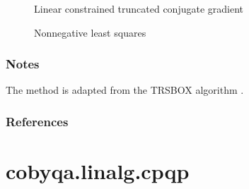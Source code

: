\documentclass[letterpaper,10pt,english]{sphinxmanual}
\begin{document}
\begin{fulllineitems}
\begin{description}
\item[{{\hyperref[\detokenize{refs/generated/cobyqa.linalg.lctcg:cobyqa.linalg.lctcg}]{}}}] \leavevmode
\sphinxAtStartPar
Linear constrained truncated conjugate gradient

\item[{{\hyperref[\detokenize{refs/generated/cobyqa.linalg.nnls:cobyqa.linalg.nnls}]{}}}] \leavevmode
\sphinxAtStartPar
Nonnegative least squares

\end{description}


\subsubsection*{Notes}

\sphinxAtStartPar
The method is adapted from the TRSBOX algorithm .
\subsubsection*{References}

\sphinxAtStartPar
{}

\end{fulllineitems}



\section{cobyqa.linalg.cpqp}
\label{\detokenize{refs/generated/cobyqa.linalg.cpqp:cobyqa-linalg-cpqp}}\label{\detokenize{refs/generated/cobyqa.linalg.cpqp::doc}}
\end{document}
